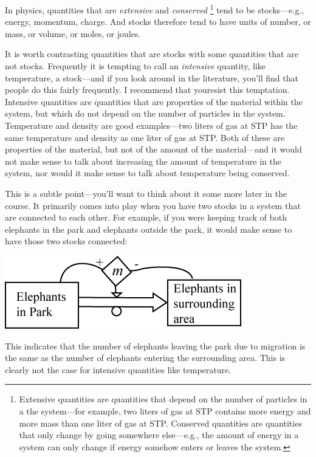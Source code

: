 In physics, quantities that are {\it extensive} and {\it conserved} \footnote{Extensive quantities are quantities that depend on the number of particles in a the system---for example, two liters of gas at STP contains more energy and more mass than one liter of gas at STP. Conserved quantities are quantities that only change by going somewhere else---e.g., the amount of energy in a system can only change if energy somehow enters or leaves the system.}  tend to be stocks---e.g., energy, momentum, charge.  And stocks therefore tend to have units of number, or mass, or volume, or moles, or joules.

It is worth contrasting quantities that are stocks with some quantities that are not stocks.  Frequently it is tempting to call an {\it intensive} quantity, like temperature, a stock---and if you look around in the literature, you'll find that people do this fairly frequently.  I recommend that youresist this temptation. Intensive quantities are quantities that are properties of the material within the system, but which do not depend on the number of particles in the system.  Temperature and density are good examples---two liters of gas at STP has the same temperature and density as one liter of gas at STP.  Both of these are properties of the material, but not of the amount of the material---and it would not make sense to talk about increasing the amount of temperature in the system, nor would it make sense to talk about temperature being conserved.  

This is a subtle point---you'll want to think about it some more later in the course. It primarily comes into play when you have two stocks in a system that are connected to each other.  For example, if you were keeping track of both elephants in the park and elephants outside the park, it would make sense to have those two stocks connected:

\beforefig
\centerline{\includegraphics[height=.6in]{figs/TwoStockElephantsExample1}}
\afterfig
This indicates that the number of elephants leaving the park due to migration is the same as the number of elephants entering the surrounding area.    This is clearly not the case for intensive quantities like temperature. 



